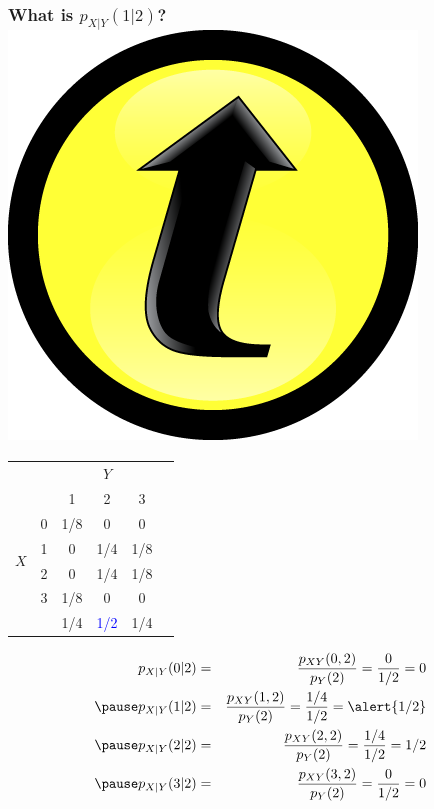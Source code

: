 \documentclass[handout]{beamer}
\begin{document}
\begin{frame}
\frametitle{What is $p_{X|Y}(1|2)$? \hfill \includegraphics[scale = 0.05]{./images/clicker}}
\small
\begin{table}
\begin{tabular}{|cc|ccc|c|}
\hline
&&\multicolumn{3}{c|}{$Y$}&\\
&&1 & 2&3&\\
\hline
\multirow{4}{*}{$X$}
&0& \multicolumn{1}{|c}{1/8} & \alert{0}&0&\\
&1& \multicolumn{1}{|c}{0} & \alert{1/4}&1/8&\\
&2& \multicolumn{1}{|c}{0} & \alert{1/4}&1/8&\\
&3& \multicolumn{1}{|c}{1/8} & \alert{0}&0&\\
\hline 
&&1/4&\textcolor{blue}{1/2}&1/4&\\
\hline
\end{tabular}
\end{table}

\pause
\begin{eqnarray*}
	p_{X|Y}(0|2) &=&\frac{p_{XY}(0,2)}{p_Y(2)} = \frac{0}{1/2} = 0\\ \pause
	p_{X|Y}(1|2) &=&\frac{p_{XY}(1,2)}{p_Y(2)}=\frac{1/4}{1/2}= \alert{1/2}\\ \pause
	 p_{X|Y}(2|2) &=&\frac{p_{XY}(2,2)}{p_Y(2)}=\frac{1/4}{1/2}= 1/2\\ \pause
	 	 p_{X|Y}(3|2) &=&\frac{p_{XY}(3,2)}{p_Y(2)}=\frac{0}{1/2} = 0\\
\end{eqnarray*}


\end{frame}
\end{document}
